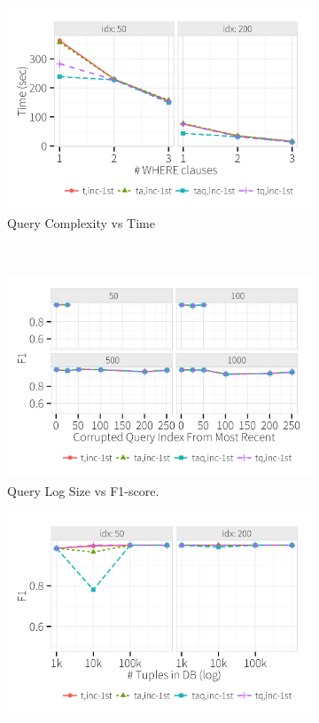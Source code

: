 \begin{figure}[h]
\begin{subfigure}[t]{.3\textwidth}
      \includegraphics[width = \columnwidth]{figures/where_time}
      \vspace*{-.1in}
      \caption{Query Complexity vs Time}
      \label{f:scale3} 
    \end{subfigure}
    \\
    \begin{subfigure}[t]{.3\textwidth}
      \includegraphics[width = .95\columnwidth]{figures/logsize_acc}
      \vspace*{-.1in}
      \caption{Query Log Size vs F1-score.}
      \label{f:scale1} 
    \end{subfigure}
    \begin{subfigure}[t]{.3\textwidth}
      \includegraphics[width = .95\columnwidth]{figures/dbsize_acc}

\end{subfigure}
\end{figure}
